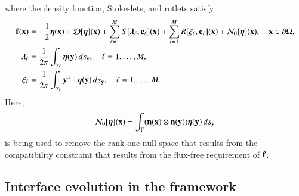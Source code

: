 \documentclass[preprint, 10pt]{elsarticle}
\begin{document}
where the density function, Stokeslets, and rotlets satisfy
\begin{subequations}
\label{eqn:completed_BIE}
\begin{align}
  {\mathbf{f}}({\mathbf{x}}) &= -\frac{1}{2}{\boldsymbol\eta}({\mathbf{x}}) + {\mathcal{D}}[{\boldsymbol\eta}]({\mathbf{x}}) + 
      \sum_{\ell=1}^{M} S[{\boldsymbol\lambda}_\ell,{\mathbf{c}}_\ell]({\mathbf{x}}) +
      \sum_{\ell=1}^{M} R[\xi_\ell,{\mathbf{c}}_\ell]({\mathbf{x}}) + {\mathcal{N}}_0[{\boldsymbol\eta}]({\mathbf{x}}),
      \quad {\mathbf{x}} \in {\partial}\Omega, 
      \label{eqn:DLP}\\
  {\boldsymbol\lambda}_\ell &= \frac{1}{2\pi}\int_{\gamma_\ell} {\boldsymbol\eta}({\mathbf{y}}) \, ds_{\mathbf{y}},
  \quad \ell=1,\ldots,M,
  \label{eqn:stokeslet} \\
  \xi_\ell &= \frac{1}{2\pi}\int_{\gamma_\ell} {\mathbf{y}}^\perp \cdot {\boldsymbol\eta}({\mathbf{y}})
  \, ds_{\mathbf{y}}, \quad \ell=1,\ldots,M.
  \label{eqn:rotlet}
\end{align}
\end{subequations}
Here,
\begin{align*}
  {\mathcal{N}}_0[{\boldsymbol\eta}]({\mathbf{x}}) = \int_{\Gamma} 
    ({\mathbf{n}}({\mathbf{x}}) \otimes {\mathbf{n}}({\mathbf{y}})){\boldsymbol\eta}({\mathbf{y}}) \, ds_{\mathbf{y}}
\end{align*}
is being used to remove the rank one null space that results from the
compatibility constraint that results from the flux-free requirement of
${\mathbf{f}}$.


\subsection{Interface evolution in the {\thL} framework} 
\label{sec:thetaL}



\end{document}
